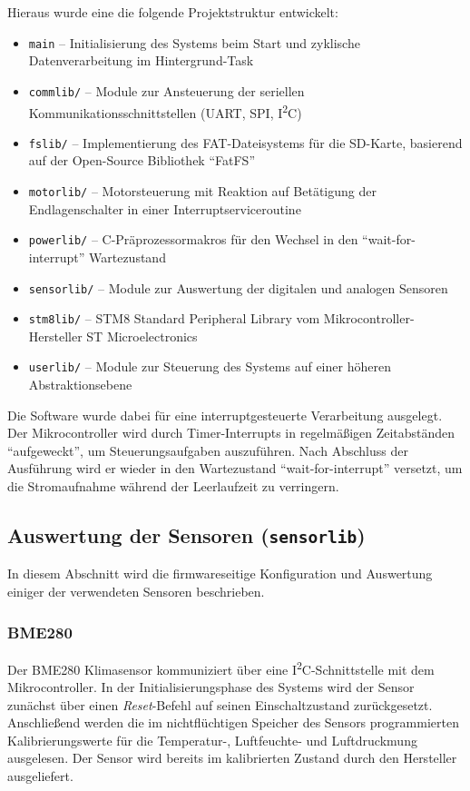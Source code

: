     Hieraus wurde eine die folgende Projektstruktur entwickelt:
    \begin{itemize}
        \item \texttt{main} -- Initialisierung des Systems beim Start und zyklische Datenverarbeitung im Hintergrund-Task
        \item \texttt{commlib/} -- Module zur Ansteuerung der seriellen Kommunikationsschnittstellen (UART, SPI, I\textsuperscript{2}C)
        \item \texttt{fslib/} -- Implementierung des FAT-Dateisystems für die SD-Karte, basierend auf der Open-Source Bibliothek ``FatFS''~\cite{elmchan_fatfs}
        \item \texttt{motorlib/} -- Motorsteuerung mit Reaktion auf Betätigung der Endlagenschalter in einer Interruptserviceroutine
        \item \texttt{powerlib/} -- C-Präprozessormakros für den Wechsel in den ``wait-for-interrupt'' Wartezustand
        \item \texttt{sensorlib/} -- Module zur Auswertung der digitalen und analogen Sensoren
        \item \texttt{stm8lib/} -- STM8 Standard Peripheral Library vom Mikrocontroller-Hersteller ST Microelectronics
        \item \texttt{userlib/} -- Module zur Steuerung des Systems auf einer höheren Abstraktionsebene
    \end{itemize}

    Die Software wurde dabei für eine interruptgesteuerte Verarbeitung ausgelegt. Der Mikrocontroller wird durch Timer-Interrupts in regelmäßigen Zeitabständen ``aufgeweckt'', um Steuerungsaufgaben auszuführen. Nach Abschluss der Ausführung wird er wieder in den Wartezustand ``wait-for-interrupt'' versetzt, um die Stromaufnahme während der Leerlaufzeit zu verringern.
    
    \subsection{Auswertung der Sensoren (\texttt{sensorlib})}
    In diesem Abschnitt wird die firmwareseitige Konfiguration und Auswertung einiger der verwendeten Sensoren beschrieben.
    
        \subsubsection{BME280}\label{ssec:BME280}
            Der BME280 Klimasensor kommuniziert über eine I\textsuperscript{2}C-Schnittstelle mit dem Mikrocontroller. In der Initialisierungsphase des Systems wird der Sensor zunächst über einen \emph{Reset}-Befehl auf seinen Einschaltzustand zurückgesetzt. Anschließend werden die im nichtflüchtigen Speicher des Sensors programmierten Kalibrierungswerte für die Temperatur-, Luftfeuchte- und Luftdruckmung ausgelesen. Der Sensor wird bereits im kalibrierten Zustand durch den Hersteller ausgeliefert.
            
